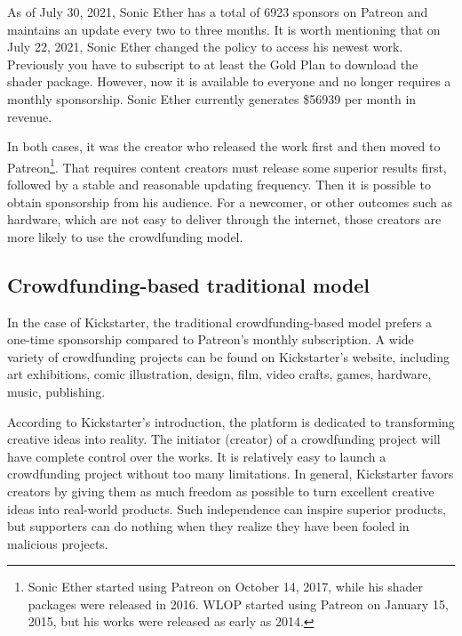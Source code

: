 \documentclass[12pt,a4paper]{article}
\begin{document}
    As of July 30, 2021, Sonic Ether has a total of 6923 sponsors on Patreon and
    maintains an update every two to three months.
    It is worth mentioning that on July 22, 2021, Sonic Ether changed the policy
    to access his newest work.
    Previously you have to subscript to at least the Gold Plan to download the
    shader package.
    However, now it is available to everyone and no longer requires a monthly
    sponsorship.
    Sonic Ether currently generates \$56939 per month in revenue.

    In both cases, it was the creator who released the work first and then moved
    to Patreon\footnote{
        Sonic Ether started using Patreon on October 14, 2017,
        while his shader packages were released in 2016.
        WLOP started using Patreon on January 15, 2015,
        but his works were released as early as 2014.
    }.
    That requires content creators must release some superior results first,
    followed by a stable and reasonable updating frequency.
    Then it is possible to obtain sponsorship from his audience.
    For a newcomer, or other outcomes such as hardware, which are not easy to
    deliver through the internet, those creators are more likely to use the
    crowdfunding model.

    \subsection{Crowdfunding-based traditional model}\label{subsec:tradition_kickstarter}

    In the case of Kickstarter, the traditional crowdfunding-based model prefers
    a one-time sponsorship compared to Patreon's monthly subscription.
    A wide variety of crowdfunding projects can be found on Kickstarter's
    website\cite{kickstarter_homepage}, including art exhibitions, comic illustration,
    design, film, video crafts, games, hardware, music, publishing.

    According to Kickstarter's introduction\cite{kickstarter_about}, the platform
    is dedicated to transforming creative ideas into reality.
    The initiator (creator) of a crowdfunding project will have complete control
    over the works.
    It is relatively easy to launch a crowdfunding project without too many
    limitations.
    In general, Kickstarter favors creators by giving them as much freedom as
    possible to turn excellent creative ideas into real-world products.
    Such independence can inspire superior products, but supporters can do
    nothing when they realize they have been fooled in malicious projects.
\end{document}
